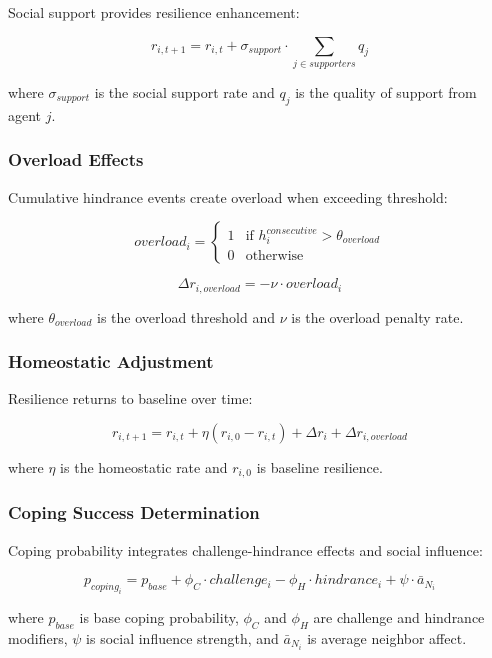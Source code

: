 \documentclass[
  letterpaper,
  DIV=11,
  numbers=noendperiod]{scrartcl}
\begin{document}
Social support provides resilience enhancement:

\[r_{i,t+1} = r_{i,t} + \sigma_{support} \cdot \sum_{j \in supporters} q_j\]

where \(\sigma_{support}\) is the social support rate and \(q_j\) is the
quality of support from agent \(j\).

\subsubsection{Overload Effects}\label{overload-effects}

Cumulative hindrance events create overload when exceeding threshold:

\[overload_i = \begin{cases} 1 & \text{if } h_i^{consecutive} > \theta_{overload} \\ 0 & \text{otherwise} \end{cases}\]

\[\Delta r_{i,overload} = -\nu \cdot overload_i\]

where \(\theta_{overload}\) is the overload threshold and \(\nu\) is the
overload penalty rate.

\subsubsection{Homeostatic Adjustment}\label{homeostatic-adjustment}

Resilience returns to baseline over time:

\[r_{i,t+1} = r_{i,t} + \eta (r_{i,0} - r_{i,t}) + \Delta r_i + \Delta r_{i,overload}\]

where \(\eta\) is the homeostatic rate and \(r_{i,0}\) is baseline
resilience.

\subsubsection{Coping Success
Determination}\label{coping-success-determination}

Coping probability integrates challenge-hindrance effects and social
influence:

\[p_{coping_i} = p_{base} + \phi_C \cdot challenge_i - \phi_H \cdot hindrance_i + \psi \cdot \bar{a}_{N_i}\]

where \(p_{base}\) is base coping probability, \(\phi_C\) and \(\phi_H\)
are challenge and hindrance modifiers, \(\psi\) is social influence
strength, and \(\bar{a}_{N_i}\) is average neighbor affect.
\end{document}

